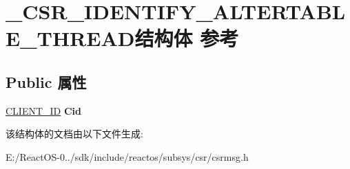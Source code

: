 \hypertarget{struct___c_s_r___i_d_e_n_t_i_f_y___a_l_t_e_r_t_a_b_l_e___t_h_r_e_a_d}{}\section{\+\_\+\+C\+S\+R\+\_\+\+I\+D\+E\+N\+T\+I\+F\+Y\+\_\+\+A\+L\+T\+E\+R\+T\+A\+B\+L\+E\+\_\+\+T\+H\+R\+E\+A\+D结构体 参考}
\label{struct___c_s_r___i_d_e_n_t_i_f_y___a_l_t_e_r_t_a_b_l_e___t_h_r_e_a_d}
\subsection*{Public 属性}
\begin{DoxyCompactItemize}
\item 
\mbox{\label{struct___c_s_r___i_d_e_n_t_i_f_y___a_l_t_e_r_t_a_b_l_e___t_h_r_e_a_d_ab8ddb3c331b6d28d464b8683bc150eb3}} 
\hyperlink{struct___c_l_i_e_n_t___i_d}{C\+L\+I\+E\+N\+T\+\_\+\+ID} {\bfseries Cid}
\end{DoxyCompactItemize}


该结构体的文档由以下文件生成\+:\begin{DoxyCompactItemize}
\item 
E\+:/\+React\+O\+S-\/0../sdk/include/reactos/subsys/csr/csrmsg.\+h\end{DoxyCompactItemize}
